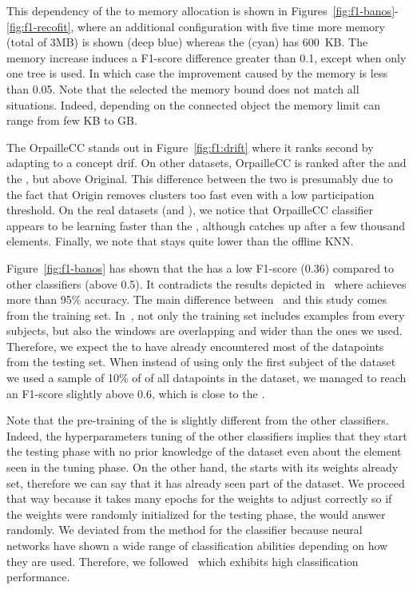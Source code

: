 This dependency of the \mondrianforest to memory allocation is shown in
Figures~\ref{fig:f1-banos}-\ref{fig:f1-recofit}, where an additional
configuration with five time more memory (total of 3MB) is shown (deep blue)
whereas the \mondrianforest (cyan) has 600~KB.  The memory increase induces a
F1-score difference greater than 0.1, except when only one tree is used. In
which case the improvement caused by the memory is less than 0.05. Note that the
selected the memory bound does not match all situations. Indeed, depending on
the connected object the memory limit can range from few KB to GB.

The \mcnn OrpailleCC stands out in Figure~\ref{fig:f1:drift} where it ranks
second by adapting to a concept drif.  On other datasets, \mcnn OrpailleCC is
ranked after the \mondrianforest and the \hoeffdingtree, but above \mcnn
Original. This difference between the two \mcnns is presumably due to the fact
that \mcnn Origin removes clusters too fast even with a low participation
threshold.  On the real datasets (\banosdataset and \recofitdataset), we notice
that \mcnn OrpailleCC classifier appears to be learning faster than the
\mondrianforest, although \mondrianforest catches up after a few thousand
elements. Finally, we note that \mcnn stays quite lower than the offline KNN.

Figure~\ref{fig:f1-banos} has shown that the \FNN has a low F1-score (0.36)
compared to other classifiers (above 0.5). It contradicts the results depicted
in~\cite{omid_2019} where \FNN achieves more than 95\% accuracy. The main
difference between~\cite{omid_2019} and this study comes from the training set.
In~\cite{omid_2019}, not only the training set includes examples from every
subjects, but also the windows are overlapping and wider than the ones we used.
Therefore, we expect the \FNN to have already encountered most of the datapoints
from the testing set. When instead of using only the first subject of the
\banosdataset dataset we used a sample of 10\% of of all datapoints in the
\banosdataset dataset, we managed to reach an F1-score slightly above 0.6, which
is close to the \naivebayes.

Note that the pre-training of the \FNN is slightly different from the other
classifiers. Indeed, the hyperparameters tuning of the other classifiers implies
that they start the testing phase with no prior knowledge of the dataset even
about the element seen in the tuning phase. On the other hand, the \FNN starts
with its weights already set, therefore we can say that it has already seen part
of the dataset. We proceed that way because it takes many epochs for the weights
to adjust correctly so if the weights were randomly initialized for the testing
phase, the \FNN would answer randomly.  We deviated from the method for the \FNN
classifier because neural networks have shown a wide range of classification
abilities depending on how they are used.  Therefore, we
followed~\cite{omid_2019} which exhibits high classification performance.

